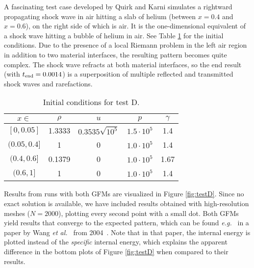 \documentclass[final,3p,twocolumn]{elsarticle}
\begin{document}
A fascinating test case developed by Quirk and Karni \cite{quirk1996dynamics}
simulates a rightward propagating shock wave in air hitting a slab of helium
(between $x=0.4$ and $x=0.6$), on the right side of which is air. It is the
one-dimensional equivalent of a shock wave hitting a bubble of helium in air.
See Table \ref{tab:testD} for the initial conditions. Due to the presence of a
local Riemann problem in the left air region in addition to two material
interfaces, the resulting pattern becomes quite complex. The shock wave
refracts at both material interfaces, so the end result (with $t_{\rm
end}=0.0014$) is a superposition of multiple reflected and transmitted shock
waves and rarefactions. 

\begin{table}[htb]
    \centering
    \begin{tabular}{ccccc}
        \hline
        $x \in $ & $\rho$ & $u$ & $p$ & $\gamma$ \\
        \hline
        $[0,0.05]$ & 1.3333 & $0.3535\sqrt{10^5}$ & $1.5\cdot 10^5$ & 1.4 \\
        $(0.05,0.4]$ & 1 & 0 & $1.0\cdot 10^5$ & 1.4 \\
        $(0.4,0.6]$ & 0.1379 & 0 & $1.0\cdot 10^5$ & 1.67 \\
        $(0.6,1]$ & 1 & 0 & $1.0\cdot 10^5$ & 1.4 \\
        \hline
    \end{tabular}
    \caption{Initial conditions for test D.}
    \label{tab:testD}
\end{table}

Results from runs with both GFMs are visualized in Figure \ref{fig:testD}.
Since no exact solution is available, we have included results obtained with
high-resolution meshes ($N=2000$), plotting every second point with a small
dot. Both GFMs yield results that converge to the expected pattern, which can
be found {\em e.g.~} in a paper by Wang {\em et al.~} from
2004 \cite{wang2004thermodynamically}. Note that in that paper, the internal
energy is plotted instead of the {\em specific} internal energy, which explains the
apparent difference in the bottom plots of Figure \ref{fig:testD} when compared
to their results. 

\end{document}
